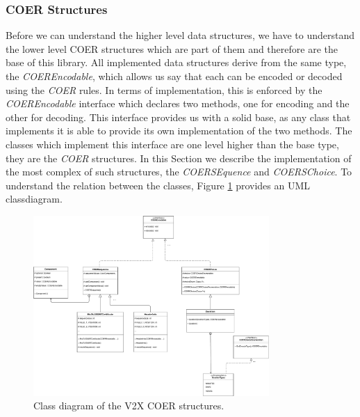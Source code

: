 \subsubsection{COER Structures}
Before we can understand the higher level data structures, we have to understand the lower level COER structures which are part of them and therefore are the base of this library. All implemented data structures derive from the same type, the \textit{COEREncodable}, which allows us say that each can be encoded or decoded using the \textit{COER} rules. In terms of implementation, this is enforced by the \textit{COEREncodable} interface which declares two methods, one for encoding and the other for decoding. This interface provides us with a solid base, as any class that implements it is able to provide its own implementation of the two methods. The classes which implement this interface are one level higher than the base type, they are the \textit{COER} structures. In this Section we describe the implementation of the most complex of such structures, the \textit{COERSEquence} and \textit{COERSChoice}. To understand the relation between the classes, Figure \ref{fig:coer_structures} provides an UML classdiagram. 

\begin{figure}[!htb]
	\centering
	\includegraphics[width=0.8\textwidth]{Figures/coerstructures}
	\caption{\label{fig:coer_structures} Class diagram of the V2X {COER} structures.}
\end{figure}

